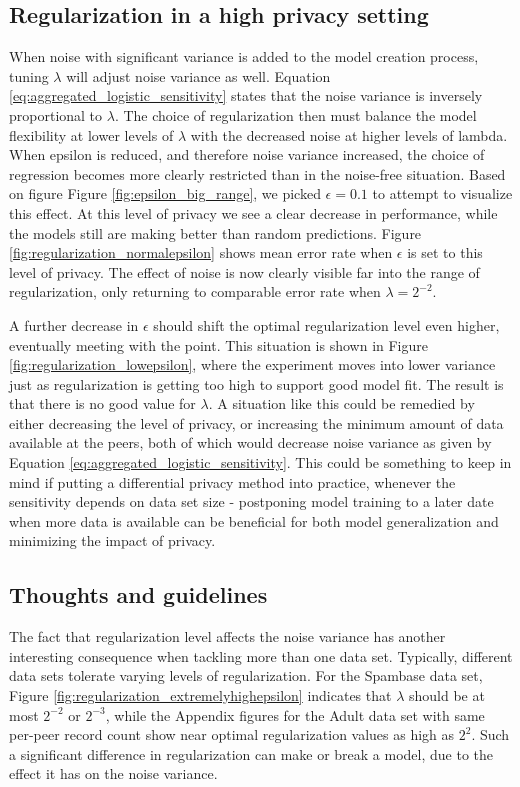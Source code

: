 \subsection{Regularization in a high privacy setting}

When noise with significant variance is added to the model creation process, tuning $\lambda$ will adjust noise variance as well. Equation \ref{eq:aggregated_logistic_sensitivity} states that the noise variance is inversely proportional to $\lambda$. The choice of regularization then must balance the model flexibility at lower levels of $\lambda$ with the decreased noise at higher levels of lambda. When epsilon is reduced, and therefore noise variance increased, the choice of regression becomes more clearly restricted than in the noise-free situation. Based on figure Figure \ref{fig:epsilon_big_range}, we picked $\epsilon = 0.1$ to attempt to visualize this effect. At this level of privacy we see a clear decrease in performance, while the models still are making better than random predictions. Figure \ref{fig:regularization_normalepsilon} shows mean error rate when $\epsilon$ is set to this level of privacy. The effect of noise is now clearly visible far into the range of regularization, only returning to comparable error rate when $\lambda = 2^{-2}$. 

A further decrease in $\epsilon$ should shift the optimal regularization level even higher, eventually meeting with the point. This situation is shown in Figure \ref{fig:regularization_lowepsilon}, where the experiment moves into lower variance just as regularization is getting too high to support good model fit. The result is that there is no good value for $\lambda$. A situation like this could be remedied by either decreasing the level of privacy, or increasing the minimum amount of data available at the peers, both of which would decrease noise variance as given by Equation \ref{eq:aggregated_logistic_sensitivity}. This could be something to keep in mind if putting a differential privacy method into practice, whenever the sensitivity depends on data set size - postponing model training to a later date when more data is available can be beneficial for both model generalization and minimizing the impact of privacy.

\subsection{Thoughts and guidelines}
\label{sec:reg_thoughts_guidelines}
The fact that regularization level affects the noise variance has another interesting consequence when tackling more than one data set. Typically, different data sets tolerate varying levels of regularization. For the Spambase data set, Figure \ref{fig:regularization_extremelyhighepsilon} indicates that $\lambda$ should be at most $2^{-2}$ or $2^{-3}$, while the Appendix figures for the Adult data set with same per-peer record count show near optimal regularization values as high as $2^2$. Such a significant difference in regularization can make or break a model, due to the effect it has on the noise variance.

